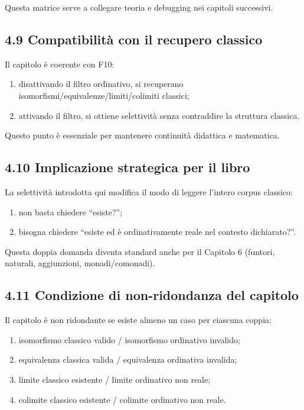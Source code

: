 Questa matrice serve a collegare teoria e debugging nei capitoli successivi.

\subsection{4.9 Compatibilità con il recupero classico}

Il capitolo è coerente con F10:

\begin{enumerate}
\def\labelenumi{\arabic{enumi}.}
\tightlist
\item
  disattivando il filtro ordinativo, si recuperano isomorfismi/equivalenze/limiti/colimiti classici;
\item
  attivando il filtro, si ottiene selettività senza contraddire la struttura classica.
\end{enumerate}

Questo punto è essenziale per mantenere continuità didattica e matematica.

\subsection{4.10 Implicazione strategica per il libro}

La selettività introdotta qui modifica il modo di leggere l'intero corpus classico:

\begin{enumerate}
\def\labelenumi{\arabic{enumi}.}
\tightlist
\item
  non basta chiedere ``esiste?'';
\item
  bisogna chiedere ``esiste ed è ordinativamente reale nel contesto dichiarato?''.
\end{enumerate}

Questa doppia domanda diventa standard anche per il Capitolo 6 (funtori, naturali, aggiunzioni, monadi/comonadi).

\subsection{4.11 Condizione di non-ridondanza del capitolo}

Il capitolo è non ridondante se esiste almeno un caso per ciascuna coppia:

\begin{enumerate}
\def\labelenumi{\arabic{enumi}.}
\tightlist
\item
  isomorfismo classico valido / isomorfismo ordinativo invalido;
\item
  equivalenza classica valida / equivalenza ordinativa invalida;
\item
  limite classico esistente / limite ordinativo non reale;
\item
  colimite classico esistente / colimite ordinativo non reale.
\end{enumerate}

